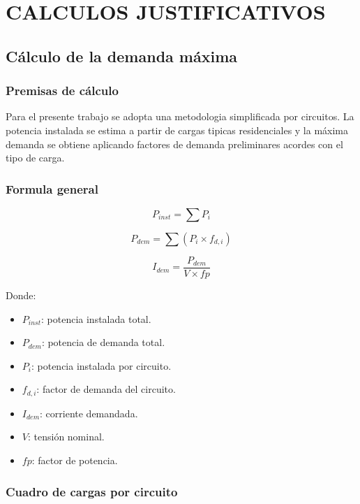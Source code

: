 \chapter{CALCULOS JUSTIFICATIVOS}

\section{Cálculo de la demanda máxima}

\subsection{Premisas de cálculo}

Para el presente trabajo se adopta una metodologia simplificada por circuitos. La potencia instalada se estima a partir de cargas tipicas residenciales y la máxima demanda se obtiene aplicando factores de demanda preliminares acordes con el tipo de carga.

\subsection{Formula general}

\begin{equation}
P_{inst} = \sum P_i
\end{equation}

\begin{equation}
P_{dem} = \sum (P_i \times f_{d,i})
\end{equation}

\begin{equation}
I_{dem} = \frac{P_{dem}}{V \times fp}
\end{equation}

Donde:

\begin{itemize}
  \item $P_{inst}$: potencia instalada total.
  \item $P_{dem}$: potencia de demanda total.
  \item $P_i$: potencia instalada por circuito.
  \item $f_{d,i}$: factor de demanda del circuito.
  \item $I_{dem}$: corriente demandada.
  \item $V$: tensión nominal.
  \item $fp$: factor de potencia.
\end{itemize}

\subsection{Cuadro de cargas por circuito}

